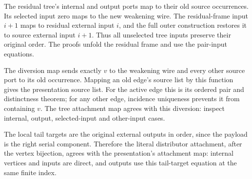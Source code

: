



The residual tree's internal and output ports map to their old source
occurrences. Its selected input zero maps to the new weakening wire. The
residual-frame input $i+1$ maps to residual external input $i$, and the full
outer construction restores it to source external input $i+1$. Thus all
unselected tree inputs preserve their original order. The proofs unfold the
residual frame and use the pair-input equations.






The diversion map sends exactly $v$ to the weakening wire and every other
source port to its old occurrence. Mapping an old edge's source list by this
function gives the presentation source list. For the active edge this is its
ordered pair and distinctness theorem; for any other edge, incidence uniqueness
prevents it from containing $v$. The tree attachment map agrees with this
diversion: inspect internal, output, selected-input and other-input cases.




The local tail targets are the original external outputs in order, since the
payload is the right serial component. Therefore the literal distributor
attachment, after the vertex bijection, agrees with the presentation's
attachment map: internal vertices and inputs are direct, and outputs use
this tail-target equation at the same finite index.

